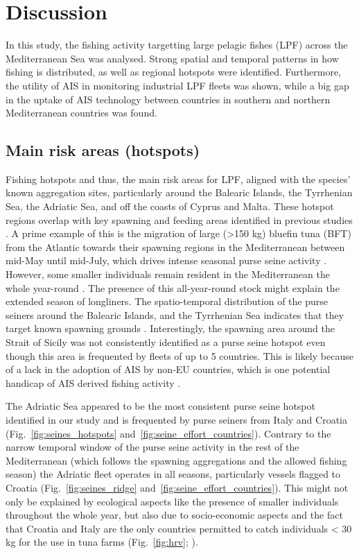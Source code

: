 \chapter{Discussion}
In this study, the fishing activity targetting large pelagic fishes (LPF) across the Mediterranean
Sea was analysed. Strong spatial and temporal patterns in how fishing is distributed, as well as
regional hotspots were identified. Furthermore, the utility of AIS in monitoring industrial LPF
fleets was shown, while a big gap in the uptake of AIS technology between countries in southern and
northern Mediterranean countries was found.

\section{Main risk areas (hotspots)}
Fishing hotspots and thus, the main risk areas for LPF, aligned with the species' known aggregation
sites, particularly around the Balearic Islands, the Tyrrhenian Sea, the Adriatic Sea, and off the
coasts of Cyprus and Malta. These hotspot regions overlap with key spawning and feeding areas
identified in previous studies \citep{medina_spawning,arocha_2007}. A prime example of this is the
migration of large (>150 kg) bluefin tuna (BFT) from the Atlantic towards their spawning regions in
the Mediterranean between mid-May until mid-July, which drives intense seasonal purse seine
activity \citep{bft_mig_med}. However, some smaller individuals remain resident in the
Mediterranean the whole year-round \citep{cermeno_15_tagging,heinisch_08}. The presence of this
all-year-round stock might explain the extended season of longliners. The spatio-temporal
distribution of the purse seiners around the Balearic Islands, and the Tyrrhenian Sea indicates
that they target known spawning grounds \citep{medina_spawning}. Interestingly, the spawning area
around the Strait of Sicily was not consistently identified as a purse seine hotspot even though
this area is frequented by fleets of up to 5 countries. This is likely because of a lack in the
adoption of AIS by non-EU countries, which is one potential handicap of AIS derived fishing
activity \citep{taconet2019global,paolo24satellite}.

\medskip

The Adriatic Sea appeared to be the most consistent purse seine hotspot identified in our study and
is frequented by purse seiners from Italy and Croatia (Fig.~\ref{fig:seines_hotspots}
and~\ref{fig:seine_effort_countries}). Contrary to the narrow temporal window of the purse seine
activity in the rest of the Mediterranean (which follows the spawning aggregations and the allowed
fishing season) the Adriatic fleet operates in all seasons, particularly vessels flagged to Croatia
(Fig.~\ref{fig:seines_ridge} and~\ref{fig:seine_effort_countries}). This might not only be
explained by ecological aspects like the presence of smaller individuals throughout the whole year,
but also due to socio-economic aspects and the fact that Croatia and Italy are the only countries
permitted to catch individuals < 30 kg for the use in tuna farms (Fig.~\ref{fig:hrv};
\citealp{hrv_farms}).

